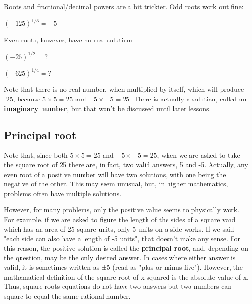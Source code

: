 Roots and fractional/decimal powers are a bit trickier. Odd roots work out fine:



$(-125)^{1/3} = -5 \;$



Even roots, however, have no real solution:



$(-25)^{1/2} = ? \;$



$(-625)^{1/4} = ? \;$



Note that there is no real number, when multiplied by itself, which will produce -25,
because $5\times5 = 25$ and $-5\times-5 = 25$. There is actually a solution, called an \textbf{imaginary
number}, but that won't be discussed until later lessons.




\subsection{Principal root}
\label{sss:prin-15ff}




Note that, since both $5\times5 = 25$ and $-5\times-5 = 25$, when we are asked to take the square root
of 25 there are, in fact, two valid answers, 5 and -5. Actually, any even root of a
positive number will have two solutions, with one being the negative of the other. This
may seem unusual, but, in higher mathematics, problems often have multiple solutions.



However, for many problems, only the positive value seems to physically work. For example,
if we are asked to figure the length of the sides of a square yard which has an area of 25
square units, only 5 units on a side works. If we said "each side can also have a length
of -5 units", that doesn't make any sense. For this reason, the positive solution is
called the \textbf{principal root}, and, depending on the question, may be the only
desired answer. In cases where either answer is valid, it is sometimes written as ±5 (read
as "plus or minus five"). However, the mathematical definition of the square root of x
squared is the absolute value of x. Thus, square roots equations do not have two answers
but two numbers can square to equal the same rational number.




